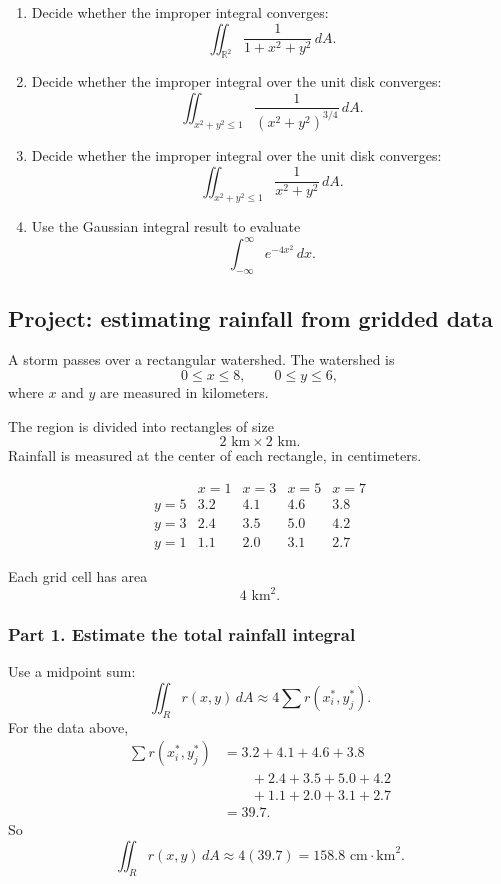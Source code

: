 \begin{enumerate}
\item Decide whether the improper integral converges:
\[
    \iint_{\mathbb R^2}\frac{1}{1+x^2+y^2}\,dA.
\]

\item Decide whether the improper integral over the unit disk converges:
\[
    \iint_{x^2+y^2\le1}\frac{1}{(x^2+y^2)^{3/4}}\,dA.
\]

\item Decide whether the improper integral over the unit disk converges:
\[
    \iint_{x^2+y^2\le1}\frac{1}{x^2+y^2}\,dA.
\]

\item Use the Gaussian integral result to evaluate
\[
    \int_{-\infty}^{\infty} e^{-4x^2}\,dx.
\]
\end{enumerate}

\subsection{Project: estimating rainfall from gridded data}

A storm passes over a rectangular watershed.  The watershed is
\[
    0\le x\le8,
    \qquad
    0\le y\le6,
\]
where \(x\) and \(y\) are measured in kilometers.

The region is divided into rectangles of size
\[
    2\text{ km}\times 2\text{ km}.
\]
Rainfall is measured at the center of each rectangle, in centimeters.

\[
\begin{array}{c|cccc}
 & x=1 & x=3 & x=5 & x=7 \\ \hline
y=5 & 3.2 & 4.1 & 4.6 & 3.8\\
y=3 & 2.4 & 3.5 & 5.0 & 4.2\\
y=1 & 1.1 & 2.0 & 3.1 & 2.7
\end{array}
\]

Each grid cell has area
\[
    4\text{ km}^2.
\]

\subsubsection*{Part 1. Estimate the total rainfall integral}

Use a midpoint sum:
\[
    \iint_R r(x,y)\,dA
    \approx
    4\sum r(x_i^*,y_j^*).
\]
For the data above,
\[
\begin{aligned}
\sum r(x_i^*,y_j^*)
&=
3.2+4.1+4.6+3.8\\
&\qquad
+2.4+3.5+5.0+4.2\\
&\qquad
+1.1+2.0+3.1+2.7\\
&=
39.7.
\end{aligned}
\]
So
\[
\boxed{
    \iint_R r(x,y)\,dA
    \approx
    4(39.7)=158.8
    \text{ cm}\cdot\text{km}^2.
}
\]

